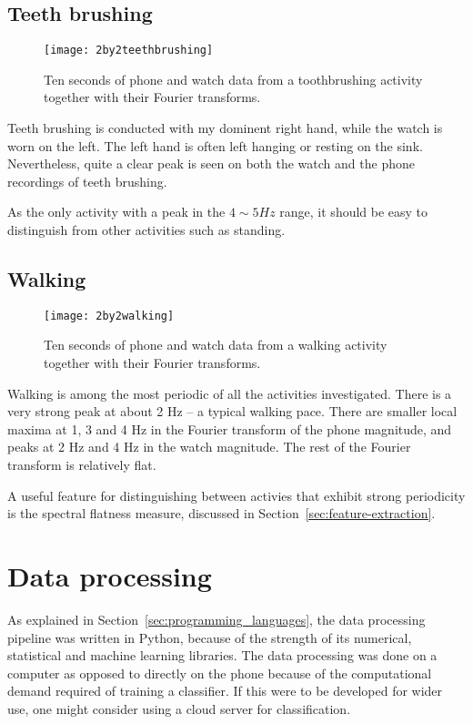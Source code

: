     \subsection{Teeth brushing}
      \begin{figure}[!th]
        \centering
        \texttt{[image: 2by2teethbrushing]}
        \caption{Ten seconds of phone and watch data from a toothbrushing activity together with their Fourier transforms.}
        \label{fig:2by2teethbrushing}
      \end{figure}
      
      Teeth brushing is conducted with my dominent right hand, while the watch is worn on the left. The left hand is often left hanging or resting on the sink. Nevertheless, quite a clear peak is seen on both the watch and the phone recordings of teeth brushing.
      
      As the only activity with a peak in the $4 \sim 5 \si{Hz}$ range, it should be easy to distinguish from other activities such as standing.
    \pagebreak[4]
    \subsection{Walking}
      \begin{figure}[!th]
        \centering
        \texttt{[image: 2by2walking]}
        \caption{Ten seconds of phone and watch data from a walking activity together with their Fourier transforms.}
        \label{fig:2by2walking}
      \end{figure}
      
      Walking is among the most periodic of all the activities investigated. There is a very strong peak at about 2 Hz -- a typical walking pace. There are smaller local maxima at 1, 3 and 4 Hz in the Fourier transform of the phone magnitude, and peaks at 2 Hz and 4 Hz in the watch magnitude. The rest of the Fourier transform is relatively flat.
      
      A useful feature for distinguishing between activies that exhibit strong periodicity is the spectral flatness measure, discussed in Section~\ref{sec:feature-extraction}.

  \section{Data processing}
    \label{sec:data-processing}
    As explained in Section~\ref{sec:programming_languages}, the data processing pipeline was written in Python, because of the strength of its numerical, statistical and machine learning libraries. The data processing was done on a computer as opposed to directly on the phone because of the computational demand required of training a classifier. If this were to be developed for wider use, one might consider using a cloud server for classification.
